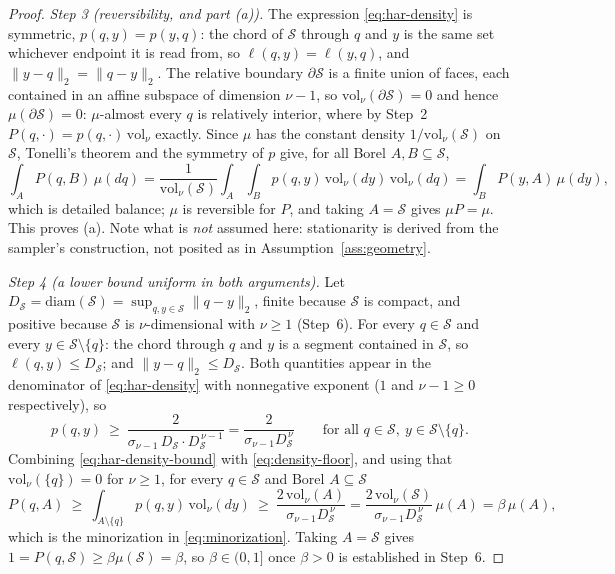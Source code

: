 \documentclass[11pt]{article}
\theoremstyle{plain}
\theoremstyle{definition}
\theoremstyle{remark}
\newcommand{\cS}{\mathcal{S}}
\begin{document}
\begin{proof}
\emph{Step 3 (reversibility, and part (a)).} The expression \eqref{eq:har-density} is
symmetric, $p(q,y)=p(y,q)$: the chord of $\cS$ through $q$ and $y$ is the same set
whichever endpoint it is read from, so $\ell(q,y)=\ell(y,q)$, and
$\|y-q\|_2=\|q-y\|_2$. The relative boundary $\partial\cS$ is a finite union of faces,
each contained in an affine subspace of dimension $\nu-1$, so
$\mathrm{vol}_\nu(\partial\cS)=0$ and hence $\mu(\partial\cS)=0$: $\mu$-almost every $q$
is relatively interior, where by Step~2 $P(q,\cdot)=p(q,\cdot)\,\mathrm{vol}_\nu$ exactly.
Since $\mu$ has the constant density $1/\mathrm{vol}_\nu(\cS)$ on $\cS$, Tonelli's theorem
and the symmetry of $p$ give, for all Borel $A,B\subseteq\cS$,
\[
    \int_A P(q,B)\,\mu(dq)
    = \frac{1}{\mathrm{vol}_\nu(\cS)}\int_A\int_B p(q,y)\,\mathrm{vol}_\nu(dy)\,\mathrm{vol}_\nu(dq)
    = \int_B P(y,A)\,\mu(dy),
\]
which is detailed balance; $\mu$ is reversible for $P$, and taking $A=\cS$ gives
$\mu P=\mu$. This proves (a). Note what is \emph{not} assumed here: stationarity is
derived from the sampler's construction, not posited as in
Assumption~\ref{ass:geometry}.

\emph{Step 4 (a lower bound uniform in both arguments).} Let
$D_\cS=\mathrm{diam}(\cS)=\sup_{q,y\in\cS}\|q-y\|_2$, finite because $\cS$ is compact,
and positive because $\cS$ is $\nu$-dimensional with $\nu\ge1$ (Step~6). For every
$q\in\cS$ and every $y\in\cS\setminus\{q\}$: the chord through $q$ and $y$ is a segment
contained in $\cS$, so $\ell(q,y)\le D_\cS$; and $\|y-q\|_2\le D_\cS$. Both quantities
appear in the denominator of \eqref{eq:har-density} with nonnegative exponent ($1$ and
$\nu-1\ge0$ respectively), so
\begin{equation}\label{eq:density-floor}
    p(q,y)\ \ge\ \frac{2}{\sigma_{\nu-1}\,D_\cS\cdot D_\cS^{\,\nu-1}}
    = \frac{2}{\sigma_{\nu-1}D_\cS^{\,\nu}}
    \qquad\text{for all }q\in\cS,\ y\in\cS\setminus\{q\}.
\end{equation}
Combining \eqref{eq:har-density-bound} with \eqref{eq:density-floor}, and using that
$\mathrm{vol}_\nu(\{q\})=0$ for $\nu\ge1$, for every $q\in\cS$ and Borel $A\subseteq\cS$
\[
    P(q,A)\ \ge\ \int_{A\setminus\{q\}}p(q,y)\,\mathrm{vol}_\nu(dy)
    \ \ge\ \frac{2\,\mathrm{vol}_\nu(A)}{\sigma_{\nu-1}D_\cS^{\,\nu}}
    = \frac{2\,\mathrm{vol}_\nu(\cS)}{\sigma_{\nu-1}D_\cS^{\,\nu}}\,\mu(A)
    = \beta\,\mu(A),
\]
which is the minorization in \eqref{eq:minorization}. Taking $A=\cS$ gives
$1=P(q,\cS)\ge\beta\mu(\cS)=\beta$, so $\beta\in(0,1]$ once $\beta>0$ is established in
Step~6.


\end{proof}
\end{document}
